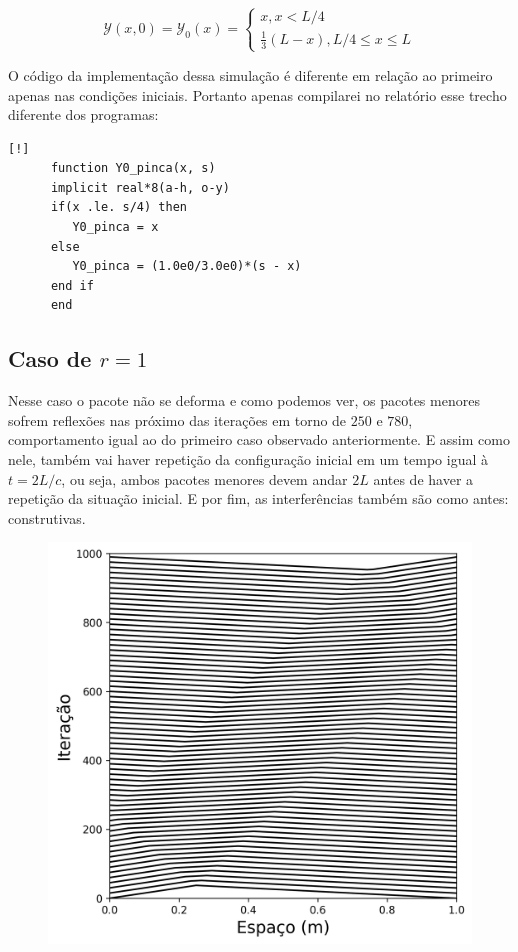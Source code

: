 \documentclass[a4paper, 11pt]{tufte-handout}
\begin{document}
\begin{equation}
  \mathcal{Y}(x, 0) = \mathcal{Y}_0(x) = \begin{cases}
    x, x < L/4\\
    \frac{1}{3} \left( L - x \right), L/4 \leq x \leq L
  \end{cases}
  \label{eq:y_0_pinca}
\end{equation}


O código da implementação dessa simulação é diferente em relação ao primeiro apenas nas condições
iniciais. Portanto apenas compilarei no relatório esse trecho diferente dos programas:

\begin{verbatim}[!]
      function Y0_pinca(x, s)
      implicit real*8(a-h, o-y)
      if(x .le. s/4) then
         Y0_pinca = x
      else
         Y0_pinca = (1.0e0/3.0e0)*(s - x)
      end if
      end
\end{verbatim}


\subsection{Caso de \( r = 1 \) }
Nesse caso o pacote não se deforma e como podemos ver, os pacotes menores sofrem reflexões
nas próximo das iterações em torno de $250$ e $780$, comportamento igual ao do primeiro caso observado
anteriormente. E assim como nele, também vai haver repetição da configuração inicial em um tempo
igual à \( t = 2L/c \), ou seja, ambos pacotes menores devem andar \( 2L \) antes de haver a
repetição da situação inicial. E por fim, as interferências também são como antes: construtivas.

\begin{figure}[h!] 
    \centering
    \centering
    \includegraphics[width=0.5\linewidth]{graf-tarefa2-a}
    \caption{}
    \label{fig:subA}
\end{figure}
\end{document}

